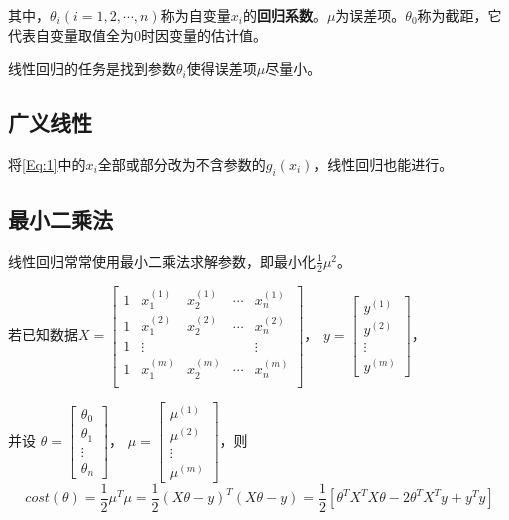 \documentclass[withoutpreface]{cumcmthesis}
\begin{document}
其中，$\theta_i(i=1,2,\cdots,n)$称为自变量$x_i$的\textbf{回归系数}。$\mu$为误差项。$\theta_0$称为截距，它代表自变量取值全为0时因变量的估计值。

线性回归的任务是找到参数$\theta_i$使得误差项$\mu$尽量小。

\subsection{广义线性}

将\cref{Eq:1}中的$x_i$全部或部分改为不含参数的$g_i(x_i)$，线性回归也能进行。

\subsection{最小二乘法}

线性回归常常使用最小二乘法求解参数，即最小化$\frac{1}{2}\mu^2$。

若已知数据$X = \begin{bmatrix}
    1 & x_1^{(1)} & x_2^{(1)} & \cdots & x_n^{(1)} \\
    1 & x_1^{(2)} & x_2^{(2)} & \cdots & x_n^{(2)} \\
    1 & \vdots    &           &        & \vdots    \\
    1 & x_1^{(m)} & x_2^{(m)} & \cdots & x_n^{(m)} \\
  \end{bmatrix}$，
$y=\begin{bmatrix}
    y^{(1)} \\
    y^{(2)} \\
    \vdots  \\
    y^{(m)}
  \end{bmatrix}$，

并设
$\theta=\begin{bmatrix}
    \theta_0 \\
    \theta_1 \\
    \vdots   \\
    \theta_n\end{bmatrix}$，
$\mu=\begin{bmatrix}
    \mu^{(1)} \\
    \mu^{(2)} \\
    \vdots    \\
    \mu^{(m)}\end{bmatrix}$，则
\begin{equation}\label{Eq:2}
  cost(\theta)=\frac{1}{2}\mu^T\mu=\frac{1}{2}         (X\theta-y)^T(X\theta-y)=\frac{1}{2}[\theta^TX^TX\theta-2\theta^TX^Ty+y^Ty]
\end{equation}
\end{document}
